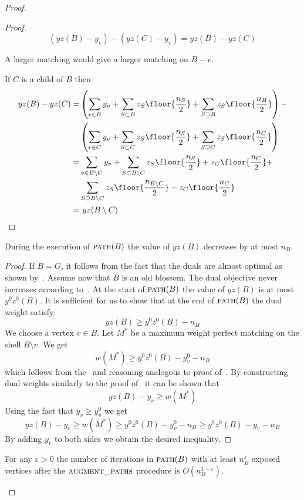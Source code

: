 \begin{proof}
\begin{proof}
    \[ (yz(B) - y_v) - (yz(C) - y_v) = yz(B) - yz(C) \]

    A larger matching would give a larger matching on $B - v$.

    If $C$ is a child of $B$ then
    \begin{align*}
    yz(B) - yz(C) =
      &\left(\sum_{v \in B} y_v + \sum_{S \subset B} z_S \floor{\frac{n_S}{2}} + \sum_{S \supseteq B} z_S \floor{\frac{n_B}{2}}\right) - \\
    &\left(\sum_{v \in C} y_v + \sum_{S \subset C} z_S \floor{\frac{n_S}{2}} + \sum_{S \supseteq C} z_S \floor{\frac{n_C}{2}}\right)  \\
    = &\sum_{v \in B \setminus C} y_v + \sum_{S \subset B \setminus C} z_S \floor{\frac{n_S}{2}} + z_C\floor{\frac{n_C}{2}} + \\
    &\sum_{S \supseteq B \setminus C} z_S \floor{\frac{n_{B \setminus C}}{2}} - z_C\floor{\frac{n_C}{2}} \\
    = &\ yz(B \setminus C)
    \end{align*}
\end{proof}

\begin{lemma}\label{lem:pathyz}
    During the execution of $\textsc{path}(B)$ the value of $yz(B)$ decreases by at most $n_B$.
\end{lemma}

\begin{proof}
    If $B = G$, it follows from the fact that the duals are almost optimal as shown by~.
    Assume now that $B$ is an old blossom. The dual objective never increases according to~. At the start of $\textsc{path}(B)$ the value of $yz(B)$ is at most $y^0z^0(B)$. It is sufficient for us to show that at the end of $\textsc{path}(B)$ the dual weight satisfy:
    \[ yz(B) \geq y^0z^0(B) - n_B \]
    We choose a vertex $v \in B$. Let $M^*$ be a maximum weight perfect matching on the shell $B \setminus v$. We get
    \[ w(M^*) \geq y^0z^0(B) - y^0_v - n_B \]
    which follows from the~ and reasoning analogous to proof of~. By constructing dual weights similarly to the proof of~ it can be shown that
    \[ yz(B) - y_v \geq w(M^*) \]
    Using the fact that $y_v \geq y_v^0$ we get
    \[ yz(B) - y_v \geq w(M^*) \geq y^0z^0(B) - y^0_v - n_B \geq y^0z^0(B) - y_v - n_B \]
    By adding $y_v$ to both sides we obtain the desired inequality.
\end{proof}

\begin{lemma}\label{lem:epsilon}
    For any $\varepsilon > 0$ the number of iterations in $\textsc{path}(B)$ with at least $n_B^\varepsilon$ exposed vertices after the $\textsc{augment\_paths}$ procedure is $O(n_B^{1-\varepsilon})$.
\end{lemma}


\end{proof}
